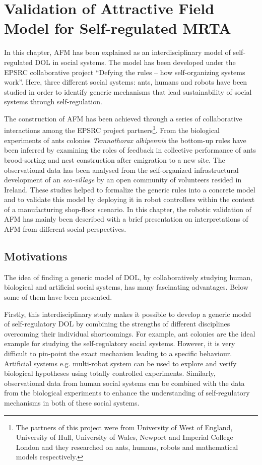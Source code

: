\chapter{Validation of Attractive Field Model for Self-regulated MRTA}
\label{afm}
In this chapter,  AFM \cite{Arcaute+2008} has been explained as an interdisciplinary model of self-regulated DOL in social systems. The model has been developed under the EPSRC collaborative project ``Defying the rules – how self-organizing systems work''. Here,  three different social systems: ants, humans and robots have been studied in order to identify generic mechanisms that lead sustainability of social systems through self-regulation.

The construction of AFM has been achieved through a series of collaborative interactions among the EPSRC project partners\footnote{The partners of this project were from University of West of England, University of Hull, University of Wales, Newport and Imperial College London and they researched on ants, humans, robots and mathematical models respectively.}. From the biological experiments of ants colonies {\em Temnothorax albipennis} the bottom-up rules have been inferred by examining the roles of feedback in collective performance of ants brood-sorting and nest construction after emigration to a new site. The observational data has been analysed from the self-organized infrastructural development of an {\em eco-village} by an open community of volunteers resided in Ireland. These studies helped  to formalize the generic rules into a concrete model  and to validate this model by deploying it in robot controllers within the context of a manufacturing shop-floor scenario. In this chapter, the robotic validation of AFM has mainly been described with a brief presentation on interpretations of AFM from different social perspectives.
\section{Motivations}
\label{afm:motivations}
The idea of finding a generic model of DOL, by collaboratively  studying human, biological and artificial social systems, has many fascinating advantages. Below some of them have been presented.

Firstly, this interdisciplinary study makes it possible to develop a generic model of self-regulatory DOL by combining the strengths of different disciplines overcoming their individual shortcomings. For example, ant colonies are the ideal example for studying the self-regulatory social systems. However, it is very difficult to pin-point the exact mechanism leading to a specific behaviour. Artificial systems e.g.  multi-robot system can be used to explore and verify biological hypotheses using totally controlled experiments. Similarly, observational data from human social systems can be combined with the data from the biological experiments to enhance the understanding of self-regulatory mechanisms in both of these social systems.
 
